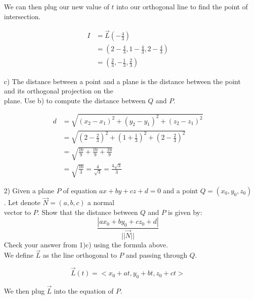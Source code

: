 \documentclass{article}
\begin{document}
\begin{text}
\indent\indent We can then plug our new value of $t$ into our orthogonal line to find the point of intersection.
\end{text}

\begin{align*}
I &= \vec{L}(-\frac{4}{3}) \\
  &= (2 - \frac{4}{3}, 1 - \frac{4}{3}, 2 - \frac{4}{3}) \\
  &= (\frac{2}{3}, -\frac{1}{3}, \frac{2}{3})
\end{align*}

\begin{text}
\indent c) The distance between a point and a plane is the distance between the point and its orthogonal projection on the \\
\indent\indent\indent plane.  Use b) to compute the distance between $Q$ and $P$.
\end{text}

\begin{align*}
d &= \sqrt{(x_2 - x_1)^2 + (y_2 - y_1)^2 + (z_2 - z_1)^2} \\
&= \sqrt{(2 - \frac{2}{3})^2 + (1 + \frac{1}{3})^2 + (2 - \frac{2}{3})^2} \\
&= \sqrt{\frac{16}{9} + \frac{16}{9} + \frac{16}{9}} \\
&= \sqrt{\frac{16}{3}} = \frac{4}{\sqrt{3}} = \frac{4\sqrt{3}}{3}
\end{align*}

\newpage

\begin{text}
2) Given a plane $P$ of equation $ax + by + cz + d = 0$ and a point $Q = (x_0, y_0, z_0)$. Let denote $\vec{N} = (a, b, c)$ a normal \\
\indent\indent vector to $P$.  Show that the distance between $Q$ and $P$ is given by:
$$
\frac{|ax_0 + by_0 + cz_0 + d|}{||\vec{N}||}
$$
\indent\indent Check your answer from 1)c) using the formula above. \\
\newline
\indent\indent We define $\vec{L}$ as the line orthogonal to $P$ and passing through $Q$.
\end{text}

$$
\vec{L}(t) = <x_0 + at, y_0 + bt, z_0 + ct>
$$

\begin{text}
\indent We then plug $\vec{L}$ into the equation of $P$.
\end{text}
\end{document}
